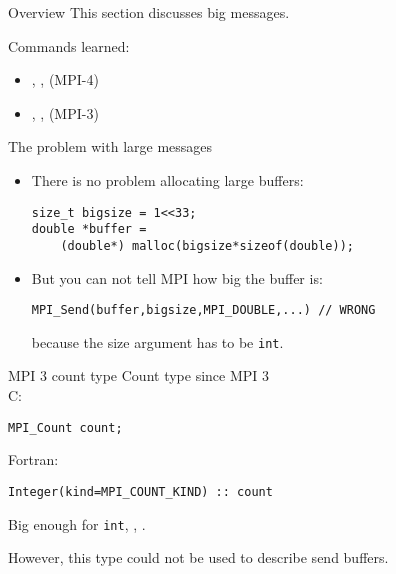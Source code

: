 
\begin{numberedframe}{Overview}
  This section discusses big messages.

  Commands learned:
  \begin{itemize}
  \item {}, ,
     (MPI-4)
  \item {}, ,
     (MPI-3)
  \end{itemize}
\end{numberedframe}

\begin{numberedframe}{The problem with large messages}
  \begin{itemize}
  \item There is no problem allocating large buffers:
\begin{lstlisting}
size_t bigsize = 1<<33;
double *buffer =
    (double*) malloc(bigsize*sizeof(double));
\end{lstlisting}
\item But you can not tell MPI how big the buffer is:
\begin{lstlisting}
MPI_Send(buffer,bigsize,MPI_DOUBLE,...) // WRONG
\end{lstlisting}
because the size argument has to be \lstinline{int}.
  \end{itemize}
\end{numberedframe}

\begin{numberedframe}{MPI 3 count type}
  Count type since MPI 3\\
  C:
\begin{lstlisting}
MPI_Count count;
\end{lstlisting}
Fortran:
\lstset{language=Fortran}
\begin{lstlisting}
Integer(kind=MPI_COUNT_KIND) :: count
\end{lstlisting}
\lstset{language=C}
Big enough for \lstinline{int}, , .

However, this type could not be used to describe send buffers.
\end{numberedframe}

